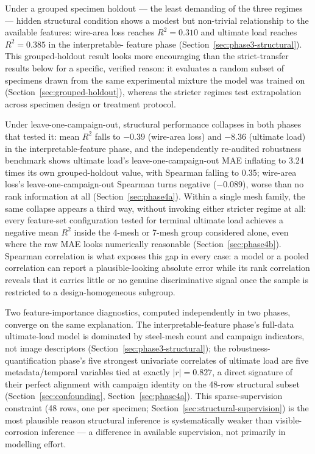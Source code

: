 Under a grouped specimen holdout — the least demanding of the three
regimes — hidden structural condition shows a modest but non-trivial
relationship to the available features: wire-area loss reaches
$R^2=0.310$ and ultimate load reaches $R^2=0.385$ in the interpretable-
feature phase (Section~\ref{sec:phase3-structural}). This grouped-holdout
result looks more encouraging than the strict-transfer results below for a
specific, verified reason: it evaluates a random subset of specimens drawn
from the same experimental mixture the model was trained on
(Section~\ref{sec:grouped-holdout}), whereas the stricter regimes test
extrapolation across specimen design or treatment protocol.

Under leave-one-campaign-out, structural performance collapses in both
phases that tested it: mean $R^2$ falls to $-0.39$ (wire-area loss) and
$-8.36$ (ultimate load) in the interpretable-feature phase, and the
independently re-audited robustness benchmark shows ultimate load's
leave-one-campaign-out MAE inflating to 3.24 times its own grouped-holdout
value, with Spearman falling to 0.35; wire-area loss's leave-one-campaign-out
Spearman turns negative ($-0.089$), worse than no rank information at all
(Section~\ref{sec:phase4a}). Within a single mesh family, the same
collapse appears a third way, without invoking either stricter regime at
all: every feature-set configuration tested for terminal ultimate load
achieves a negative mean $R^2$ inside the 4-mesh or 7-mesh group considered
alone, even where the raw MAE looks numerically reasonable
(Section~\ref{sec:phase4b}). Spearman correlation is what exposes this
gap in every case: a model or a pooled correlation can report a
plausible-looking absolute error while its rank correlation reveals that it
carries little or no genuine discriminative signal once the sample is
restricted to a design-homogeneous subgroup.

Two feature-importance diagnostics, computed independently in two phases,
converge on the same explanation. The interpretable-feature phase's
full-data ultimate-load model is dominated by steel-mesh count and
campaign indicators, not image descriptors
(Section~\ref{sec:phase3-structural}); the robustness-quantification
phase's five strongest univariate correlates of ultimate load are five
metadata/temporal variables tied at exactly $|r|=0.827$, a direct signature
of their perfect alignment with campaign identity on the 48-row structural
subset (Section~\ref{sec:confounding}, Section~\ref{sec:phase4a}). This
sparse-supervision constraint (48 rows, one per specimen;
Section~\ref{sec:structural-supervision}) is the most plausible reason
structural inference is systematically weaker than visible-corrosion
inference — a difference in available supervision, not primarily in
modelling effort.

